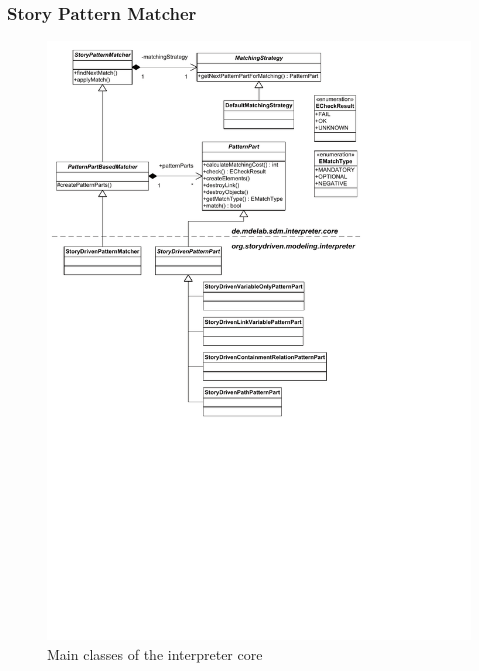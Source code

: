 \subsubsection{Story Pattern Matcher}
\label{sec:story_pattern_matcher}

\begin{figure}[htb]
  \centering
  \includegraphics[width=1.0\columnwidth]{./figures/interpreter_storyPatternMatcher.pdf}
  \caption{Main classes of the interpreter core}
  \label{fig:interpreter_storyPatternMatcher}
\end{figure}

